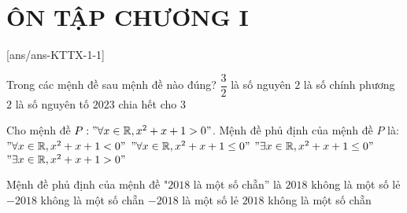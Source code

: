 ﻿\section*{ÔN TẬP CHƯƠNG I}
\setcounter{ex}{0}\setcounter{bt}{0}
[ans/ans-KTTX-1-1]
\TN
\begin{ex}%
Trong các mệnh đề sau mệnh đề nào đúng?
\choice
{ $\dfrac{3}{2}$ là số nguyên}
{ $2$ là số chính phương}
{\True $2$ là số nguyên tố}
{ $2023$ chia hết cho $3$}
\end{ex}

\begin{ex}%
Cho mệnh đề $P:"\forall x\in \mathbb{R},x^2+x+1>0"$. Mệnh đề phủ định của mệnh đề $P$ là:
\choice
{ $"\forall x\in \mathbb{R},x^2+x+1<0"$}
{ $"\forall x\in \mathbb{R},x^2+x+1\le 0"$}
{\True $"\exists x\in \mathbb{R},x^2+x+1\le 0"$}
{ $"\exists x\in \mathbb{R},x^2+x+1>0"$}
\end{ex}

\begin{ex}%
Mệnh đề phủ định của mệnh đề "$2018$ là một số chẵn'' là
\choice
{$2018$ không là một số lẻ}
{$-2018$ không là một số chẵn}
{$-2018$ là một số lẻ}
{\True $2018$ không là một số chẵn}
\end{ex}

